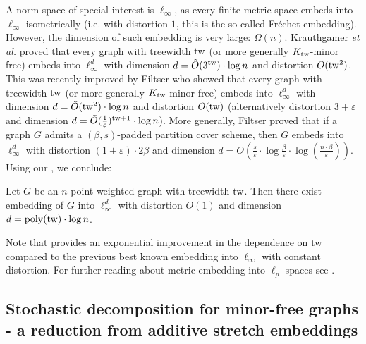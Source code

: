 \documentclass{theoretics}
\newcommand{\tw}{{\rm tw}}
\newcommand{\poly}{\mathrm{poly}}
\newcommand{\etal}{{\em et al. \xspace}}
\def\eps{\varepsilon}
\begin{document}
A norm space of special interest is $\ell_\infty$, as every finite metric space embeds into $\ell_\infty$ isometrically (i.e. with distortion $1$, this is the so called Fr\'echet embedding). However, the dimension of such embedding is very large: $\Omega(n)$.
Krauthgamer \etal \cite{KLMN04} proved that every graph with treewidth $\tw$ (or more generally $K_{\tw}$-minor free) embeds into $\ell^d_\infty$ with dimension $d=\tilde{O}(3^\tw)\cdot\log n$ and distortion $O(\tw^2)$.
This was recently improved by Filtser \cite{Filtser24} who showed that every graph with treewidth $\tw$ (or more generally $K_{\tw}$-minor free) embeds into $\ell^d_\infty$ with dimension $d=\tilde{O}(\tw^2)\cdot\log n$  and distortion $O(\tw)$ (alternatively distortion $3+\eps$ and dimension $d=\tilde{O}(\frac{1}{\eps})^{\tw+1}\cdot\log n$).
More generally, Filtser \cite{Filtser24} proved that if a graph $G$ admits a $(\beta,s)$-padded partition cover scheme, then $G$ embeds into $\ell^d_\infty$ with distortion 
$(1+\eps)\cdot2\beta$ and dimension $d=O\left(\frac{s}{\eps}\cdot\log\frac{\beta}{\eps}\cdot\log(\frac{n\cdot\beta}{\eps})\right)$. Using our , we conclude:
\begin{corollary}\label{cor:EmbeddingLinfty}
	Let $G$ be an $n$-point weighted graph with treewidth $\tw$. Then there exist embedding of $G$ into $\ell^d_\infty$ with distortion $O(1)$ and dimension $d=\poly(\tw)\cdot\log n$.
\end{corollary}
Note that  provides an exponential improvement in the dependence on $\tw$ compared to the previous best known embedding into $\ell_\infty$ with constant distortion.
For further reading about metric embedding into $\ell_p$ spaces see \cite{OS81,Bou85,LLR95,Rao99,KLMN04,GNRS04,LR10,AFGN22,KLR19,Fil19,Kumar22,Filtser24}.

\subsection{Stochastic decomposition for minor-free graphs - a reduction from additive stretch embeddings}\label{subsec:stocdecomp}
\end{document}
